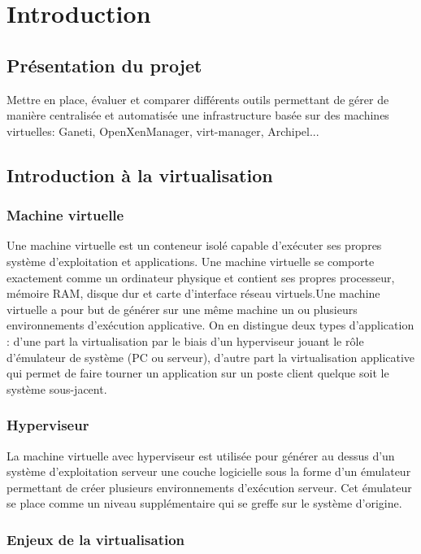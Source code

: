 \chapter{Introduction}
\section{Présentation du projet}
Mettre en place, évaluer et comparer différents outils permettant de gérer de manière
centralisée et automatisée une infrastructure basée sur des machines virtuelles: Ganeti,
OpenXenManager, virt-manager, Archipel...
\section{Introduction à la virtualisation}
\subsection{Machine virtuelle}


Une machine virtuelle est un conteneur isolé capable d\textquoteright{}exécuter
ses propres système d\textquoteright{}exploitation et applications.
Une machine virtuelle se comporte exactement comme un ordinateur physique
et contient ses propres processeur, mémoire RAM, disque dur et carte
d\textquoteright{}interface réseau virtuels.Une machine virtuelle
a pour but de générer sur une même machine un ou plusieurs environnements
d'exécution applicative. On en distingue deux types d'application
: d'une part la virtualisation par le biais d'un hyperviseur jouant
le rôle d'émulateur de système (PC ou serveur), d'autre part la virtualisation
applicative qui permet de faire tourner un application sur un poste
client quelque soit le système sous-jacent.

\subsection{Hyperviseur }


La machine virtuelle avec hyperviseur est utilisée pour générer au
dessus d'un système d'exploitation serveur une couche logicielle sous
la forme d'un émulateur permettant de créer plusieurs environnements
d'exécution serveur. Cet émulateur se place comme un niveau supplémentaire qui se greffe sur le système d'origine.
\newpage
\subsection{Enjeux de la virtualisation}


